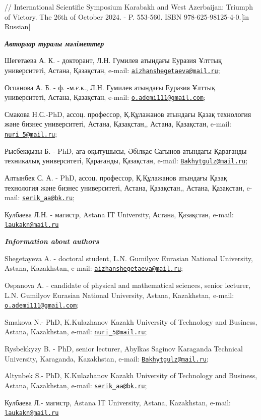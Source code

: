 // International Scientific Symposium Karabakh and West Azerbaijan:
Triumph of Victory. The 26th of October 2024. - P. 553-560. ISBN
978-625-98125-4-0.{[}in Russian{]}

\emph{{\bfseries Авторлар туралы мәліметтер}}

Шегетаева А. К. - докторант, Л.Н. Гумилев атындағы Еуразия Ұлттық
университеті, Астана, Қазақстан, e-mail:
\href{mailto:aizhanshegetaeva@mail.ru}{\nolinkurl{aizhanshegetaeva@mail.ru}};

Оспанова А. Б. - ф. -м.ғ.к., Л.Н. Гумилев атындағы Еуразия Ұлттық
университеті, Астана, Қазақстан, e-mail:
\href{mailto:o.ademi111@gmail.com}{\nolinkurl{o.ademi111@gmail.com}};

Смакова Н.С.-PhD, ассоц. профессор, Қ.Құлажанов атындағы Қазақ
технология және бизнес университеті, Астана, Қазақстан,, Астана,
Қазақстан, e-mail:
\href{mailto:nuri_5@mail.ru}{\nolinkurl{nuri\_5@mail.ru}};

Рысбекқызы Б. - PhD, аға оқытушысы, Әбілқас Сағынов атындағы Қарағанды
техникалық университеті, Қарағанды, Қазақстан, e-mail:
\href{mailto:Bakhytgulz@mail.ru}{\nolinkurl{Bakhytgulz@mail.ru}};

Алтынбек С. А. - PhD, ассоц. профессор, Қ.Құлажанов атындағы Қазақ
технология және бизнес университеті, Астана, Қазақстан,, Астана,
Қазақстан, e-mail:
\href{mailto:serik_aa@bk.ru}{\nolinkurl{serik\_aa@bk.ru}};

Кулбаева Л.Н. - магистр, Astana IT University, Астана, Қазақстан,
e-mail: \href{mailto:laukakn@mail.ru}{\nolinkurl{laukakn@mail.ru}}

\emph{{\bfseries Information about authors}}

Shegetayeva A. - doctoral student, L.N. Gumilyov Eurasian National
University, Astana, Kazakhstan, e-mail:
\href{mailto:aizhanshegetaeva@mail.ru}{\nolinkurl{aizhanshegetaeva@mail.ru}};

Ospanova A. - candidate of physical and mathematical sciences, senior
lecturer, L.N. Gumilyov Eurasian National University, Astana,
Kazakhstan, e-mail:
\href{mailto:o.ademi111@gmail.com}{\nolinkurl{o.ademi111@gmail.com}};

Smakova N.- PhD, K.Kulazhanov Kazakh University of Technology and
Business, Astana, Kazakhstan, e-mail:
\href{mailto:nuri_5@mail.ru}{\nolinkurl{nuri\_5@mail.ru}};

Rysbekkyzy B. - PhD, senior lecturer, Abylkas Saginov Karaganda
Technical University, Karaganda, Kazakhstan, e-mail:
\href{mailto:Bakhytgulz@mail.ru}{\nolinkurl{Bakhytgulz@mail.ru}};

Altynbek S.- PhD, K.Kulazhanov Kazakh University of Technology and
Business, Astana, Kazakhstan, e-mail:
\href{mailto:serik_aa@bk.ru}{\nolinkurl{serik\_aa@bk.ru}};

Кулбаева Л.- магистр, Astana IT University, Astana, Kazakhstan, e-mail:
\href{mailto:laukakn@mail.ru}{\nolinkurl{laukakn@mail.ru}}
